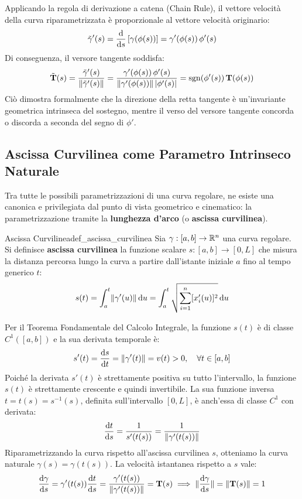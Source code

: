 Applicando la regola di derivazione a catena (Chain Rule), il vettore velocità della curva riparametrizzata è proporzionale al vettore velocità originario:
\[
\tilde{\gamma}'(s) = \frac{\mathop{}\!\mathrm{d} }{\mathop{}\!\mathrm{d} s}\left[ \gamma(\phi(s)) \right] = \gamma'(\phi(s)) \, \phi'(s)
\]
Di conseguenza, il versore tangente soddisfa:
\[
\tilde{\mathbf{T}}(s) = \frac{\tilde{\gamma}'(s)}{\lVert\tilde{\gamma}'(s)\rVert} = \frac{\gamma'(\phi(s)) \, \phi'(s)}{\lVert\gamma'(\phi(s))\rVert \, \lvert\phi'(s)\rvert} = \operatorname{sgn}(\phi'(s)) \, \mathbf{T}(\phi(s))
\]
Ciò dimostra formalmente che la direzione della retta tangente è un'invariante geometrica intrinseca del sostegno, mentre il verso del versore tangente concorda o discorda a seconda del segno di $\phi'$.

\subsection{Ascissa Curvilinea come Parametro Intrinseco Naturale}

Tra tutte le possibili parametrizzazioni di una curva regolare, ne esiste una canonica e privilegiata dal punto di vista geometrico e cinematico: la parametrizzazione tramite la \textbf{lunghezza d'arco} (o \textbf{ascissa curvilinea}).

\begin{definizione}{Ascissa Curvilinea}{def_ascissa_curvilinea}
Sia $\gamma: [a,b] \to \mathbb{R}^n$ una curva regolare. Si definisce \textbf{ascissa curvilinea} la funzione scalare $s: [a,b] \to [0, L]$ che misura la distanza percorsa lungo la curva a partire dall'istante iniziale $a$ fino al tempo generico $t$:
\[
s(t) = \int_{a}^{t} \lVert\gamma'(u)\rVert \mathop{}\!\mathrm{d} u = \int_{a}^{t} \sqrt{\sum_{i=1}^n [x_i'(u)]^2} \mathop{}\!\mathrm{d} u
\]
\end{definizione}

Per il Teorema Fondamentale del Calcolo Integrale, la funzione $s(t)$ è di classe $C^1([a,b])$ e la sua derivata temporale è:
\[
s'(t) = \frac{\mathop{}\!\mathrm{d} s}{\mathop{}\!\mathrm{d} t} = \lVert\gamma'(t)\rVert = v(t) > 0, \quad \forall t \in [a,b]
\]
Poiché la derivata $s'(t)$ è strettamente positiva su tutto l'intervallo, la funzione $s(t)$ è strettamente crescente e quindi invertibile. La sua funzione inversa $t = t(s) = s^{-1}(s)$, definita sull'intervallo $[0, L]$, è anch'essa di classe $C^1$ con derivata:
\[
\frac{\mathop{}\!\mathrm{d} t}{\mathop{}\!\mathrm{d} s} = \frac{1}{s'(t(s))} = \frac{1}{\lVert\gamma'(t(s))\rVert}
\]
Riparametrizzando la curva rispetto all'ascissa curvilinea $s$, otteniamo la curva naturale $\gamma(s) = \gamma(t(s))$. La velocità istantanea rispetto a $s$ vale:
\[
\frac{\mathop{}\!\mathrm{d} \gamma}{\mathop{}\!\mathrm{d} s} = \gamma'(t(s)) \frac{\mathop{}\!\mathrm{d} t}{\mathop{}\!\mathrm{d} s} = \frac{\gamma'(t(s))}{\lVert\gamma'(t(s))\rVert} = \mathbf{T}(s) \implies \lVert\frac{\mathop{}\!\mathrm{d} \gamma}{\mathop{}\!\mathrm{d} s}\rVert = \lVert\mathbf{T}(s)\rVert = 1
\]

